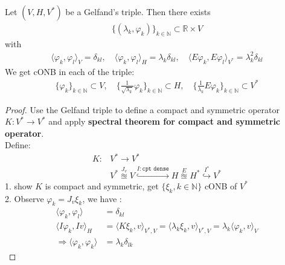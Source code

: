  
 \begin{lemma}
 	Let $(V, H, V^*)$ be a Gelfand's triple. Then there exists 
 	\begin{align*}
 		\{(\lambda_k, \varphi_k)\}_{k \in \mathbb{N}} \subset \mathbb{R} \times V
 	\end{align*}
 	with
 	\begin{align*}
 		\langle \varphi_k, \varphi_l \rangle_V = \delta_{kl}, \quad
 		\langle \varphi_k, \varphi_l \rangle_H = \lambda_k \delta_{kl}, \quad
 		\langle E\varphi_k, E\varphi_l\rangle_{V^*} = \lambda_k^2 \delta_{kl}
 	\end{align*}
 	We get cONB in each of the triple:
 	\begin{align*}
 		\{\varphi_k\}_{k \in \mathbb{N}} \subset V, \quad 
 		\{\frac{1}{\sqrt{\lambda_k}} \varphi_k\}_{k \in \mathbb{N}} \subset H, \quad
 		\{\frac{1}{\lambda_k}E\varphi_k\}_{k \in \mathbb{N}} \subset V^*
 	\end{align*} 
 \end{lemma}
 \begin{proof}
 	Use the Gelfand triple to define a compact and symmetric operator $K: V^* \rightarrow V^*$ and apply \textbf{spectral theorem for compact and symmetric operator}. \quad\\
 	Define:
 	\begin{align*}
 		K: &V^* \rightarrow V^*\\
 		&V^* \overset{J_v}{\approxeq}V \overset{I:\texttt{cpt dense}}{ \hookrightarrow} H \overset{E}{\approxeq} H^*  \overset{I^*}{\hookrightarrow} V^* 
 	\end{align*}
 	1. show $K$ is compact and symmetric, get $\{\xi_k, k \in \mathbb{N}\}$ cONB of $V^*$   \\
 	2. Observe $\varphi_k = J_v \xi_k$, we have :
 	\begin{align*}
 		\langle \varphi_k, \varphi_l \rangle &= \delta_{kl}\\
 		\langle I \varphi_k, Iv \rangle_H &= \langle K \xi_k, v \rangle_{V^*, V} = \langle \lambda_k \xi_k, v \rangle_{V^*, V} = \lambda_k \langle \varphi_k, v \rangle_V\\
 		\Rightarrow 
 		\langle \varphi_k, \varphi_k \rangle &= \lambda_k \delta_{lk}
 	\end{align*}
 \end{proof}
 
